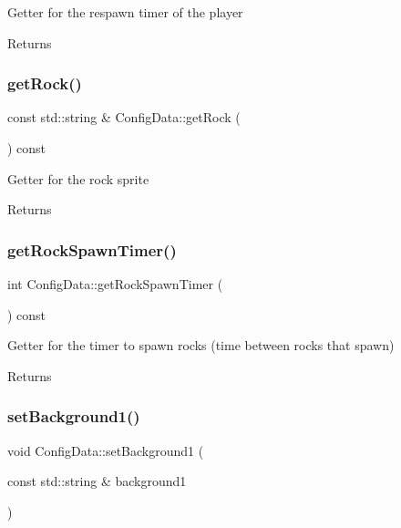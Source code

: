 Getter for the respawn timer of the player \begin{DoxyReturn}{Returns}

\end{DoxyReturn}
\mbox{\label{classConfigData_a9990a42f4759f46479488e1fb912f7b6}} 
\subsubsection{\texorpdfstring{get\+Rock()}{getRock()}}
{\footnotesize\ttfamily const std\+::string \& Config\+Data\+::get\+Rock (\begin{DoxyParamCaption}{ }\end{DoxyParamCaption}) const}

Getter for the rock sprite \begin{DoxyReturn}{Returns}

\end{DoxyReturn}
\mbox{\label{classConfigData_a7decc7f3a25937fd169f2908b27c3565}} 
\subsubsection{\texorpdfstring{get\+Rock\+Spawn\+Timer()}{getRockSpawnTimer()}}
{\footnotesize\ttfamily int Config\+Data\+::get\+Rock\+Spawn\+Timer (\begin{DoxyParamCaption}{ }\end{DoxyParamCaption}) const}

Getter for the timer to spawn rocks (time between rocks that spawn) \begin{DoxyReturn}{Returns}

\end{DoxyReturn}
\mbox{\label{classConfigData_a43959934e2e3a927e142203e637e327a}} 
\subsubsection{\texorpdfstring{set\+Background1()}{setBackground1()}}
{\footnotesize\ttfamily void Config\+Data\+::set\+Background1 (\begin{DoxyParamCaption}\item[{const std\+::string \&}]{background1 }\end{DoxyParamCaption})}

